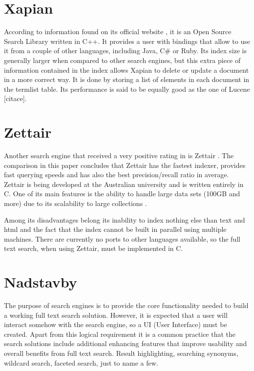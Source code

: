 \section{Xapian}

According to information found on its official website \cite{XapianHome},
it is an Open Source Search Library written in C++. 
It provides a user with bindings that allow to use it from a couple of other languages,
including Java, C\# or Ruby. 
Its index size is generally larger when compared to other search engines, but this extra piece of information contained in the index allows Xapian to delete or update a document in a more correct way. 
It is done by storing a list of elements in each document in the termlist table\cite{XapianIndexSize}. 
Its performance is said to be equally good as the one of Lucene {[}citace{]}.


\section{Zettair}

Another search engine that received a very positive rating in \cite{MiddletonBaeza} is Zettair \cite{ZettairHome}. 
The comparison in this paper concludes that Zettair has the fastest indexer, provides fast querying speeds and has also the best precision/recall ratio in average. 
Zettair is being developed at the Australian university and is written entirely
in C. 
One of its main features is the ability to handle large data
sets (100GB and more) due to its scalability to large collections \cite{ZettairHome}.

Among its disadvantages belong its inability to index nothing else than text and html and the fact that the index cannot be built in
parallel using multiple machines. 
There are currently no ports to other languages available, so the full text search, when using Zettair, must be implemented in C.


\section{Nadstavby}


The purpose of search engines is to provide the core functionality needed to build a working full text search solution.
However, it is expected that a user will interact somehow with the search engine, so a UI (User Interface) must be created. Apart from this logical requirement it is a common practice that the search solutions include additional enhancing features that improve usability and overall benefits from full text search. Result highlighting, searching synonyms, wildcard search, faceted search, just to name a few.


